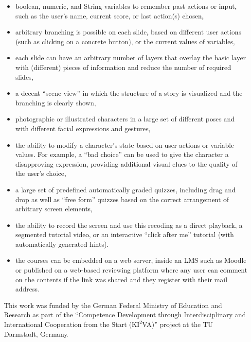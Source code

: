 \documentclass[sigconf]{acmart}
\begin{document}
\begin{itemize}
\item boolean, numeric, and String variables to remember past actions or input, such as the user's  
name, current score, or last action(s) chosen,
\item arbitrary branching is possible on each slide, based on different user actions (such as
clicking on a concrete button), or the current values of variables,
\item each slide can have an arbitrary number of layers that overlay the basic layer with (different) pieces of
information and reduce the number of required slides,
\item a decent ``scene view'' in which the structure of a story is visualized and the branching is clearly
shown,
\item photographic or illustrated characters in a large set of different poses and with different
facial expressions and gestures,
\item the ability to modify a character's state based on user actions or variable values. For example,
a ``bad choice'' can be used to give the character a disapproving expression,
providing additional visual clues to the quality of the user's choice,
\item a large set of predefined automatically graded quizzes, including drag and drop as well as ``free form''
quizzes based on the correct arrangement of arbitrary screen elements,
\item the ability to record the screen and use this recoding as a direct playback, a segmented tutorial
video, or an interactive ``click after me'' tutorial (with automatically generated hints).
\item the courses can be embedded on a web server, inside an LMS such as Moodle \cite{Moodle}
or published on a web-based reviewing platform where any user can comment on the contents if the
link was shared and they register with their mail address.
\end{itemize}

\begin{acks}
This work was funded by the German Federal Ministry of Education and Research as part of the 
``Competence Development through Interdisciplinary and International Cooperation from the Start
(K$\mathrm{I^2}$VA)'' project at the TU Darmstadt, Germany.
\end{acks}



\end{document}

